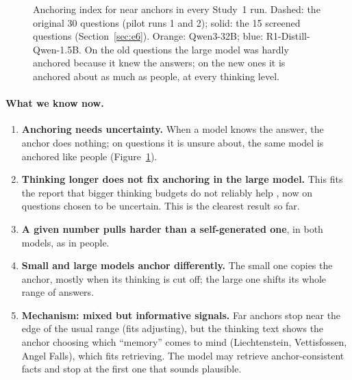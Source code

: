 \documentclass[11pt,a4paper]{article}
\begin{document}
\begin{figure}[ht]
\centering{}
\caption{Anchoring index for near anchors in every Study~1 run. Dashed: the original 30 questions (pilot runs 1 and 2); solid: the 15 screened questions (Section~\ref{sec:e6}). Orange: Qwen3-32B; blue: R1-Distill-Qwen-1.5B. On the old questions the large model was hardly anchored because it knew the answers; on the new ones it is anchored about as much as people, at every thinking level.}
\label{fig:overview}
\end{figure}

\paragraph{What we know now.}
\begin{enumerate}[leftmargin=*]
  \item \textbf{Anchoring needs uncertainty.} When a model knows the answer, the anchor does nothing; on questions it is unsure about, the same model is anchored like people (Figure~\ref{fig:overview}).
  \item \textbf{Thinking longer does not fix anchoring in the large model.} This fits the report that bigger thinking budgets do not reliably help \citep{kraishan2026long}, now on questions chosen to be uncertain. This is the clearest result so far.
  \item \textbf{A given number pulls harder than a self-generated one}, in both models, as in people.
  \item \textbf{Small and large models anchor differently.} The small one copies the anchor, mostly when its thinking is cut off; the large one shifts its whole range of answers.
  \item \textbf{Mechanism: mixed but informative signals.} Far anchors stop near the edge of the usual range (fits adjusting), but the thinking text shows the anchor choosing which \enquote{memory} comes to mind (Liechtenstein, Vettisfossen, Angel Falls), which fits retrieving. The model may retrieve anchor-consistent facts and stop at the first one that sounds plausible.
\end{enumerate}
\end{document}
